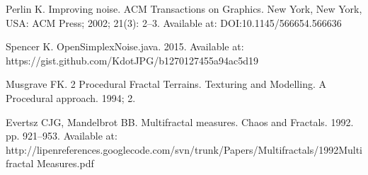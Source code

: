 Perlin K. Improving noise. ACM Transactions on Graphics. New York, New York, USA: ACM Press; 2002; 21(3): 2--3. Available at: DOI:10.1145/566654.566636

Spencer K. OpenSimplexNoise.java. 2015. Available at: https://gist.github.com/KdotJPG/b1270127455a94ac5d19

Musgrave FK. 2 Procedural Fractal Terrains. Texturing and Modelling. A Procedural approach. 1994;  2.

Evertsz CJG, Mandelbrot BB. Multifractal measures. Chaos and Fractals. 1992. pp. 921--953. Available at: http://lipenreferences.googlecode.com/svn/trunk/Papers/Multifractals/1992Multifractal Measures.pdf

